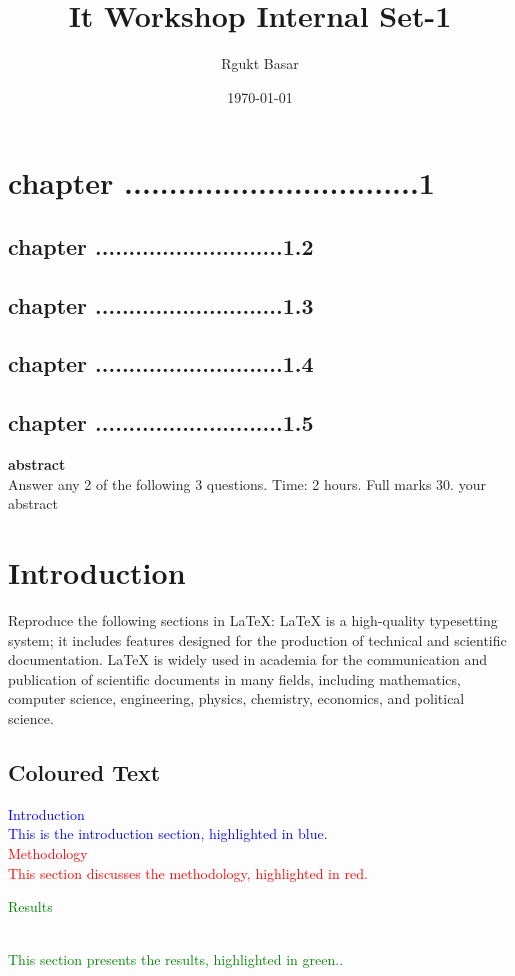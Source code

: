 \documentclass{article}
\begin{document}
\section{chapter .................................1}
\small\subsection{chapter ............................1.2}
\small\subsection{chapter ............................1.3}
\small\subsection{chapter ............................1.4}
\small\subsection{chapter ............................1.5}
\title{It Workshop Internal Set-1}
\author{Rgukt Basar}
\date{\today}
\maketitle
\centering\textbf{abstract}\\
Answer any 2 of the following 3 questions. Time: 2 hours. Full marks 30.
your abstract
\flushleft\section{Introduction}
Reproduce the following sections in LaTeX:
LaTeX is a high-quality typesetting system; it includes features designed for
the production of technical and scientific documentation. LaTeX is widely
used in academia for the communication and publication of scientific
documents in many fields, including mathematics, computer science,
engineering, physics, chemistry, economics, and political science.
\subsection{Coloured Text}
\textcolor{blue}{Introduction\\ 
	This is the introduction section, highlighted in blue.}\\
\textcolor{red}{Methodology\\
	This section discusses the methodology, highlighted in red.}\\
\begin{Huge}
	\textcolor{green}{Results}
\end{Huge}\\
\textcolor{green}{This section presents the results, highlighted in green..}
\end{document}
